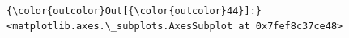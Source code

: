 \documentclass[11pt]{article}
\begin{document}
    \begin{center}
    \end{center}
    { \hspace*{\fill} \\}
    
\begin{Verbatim}[commandchars=\\\{\}]
{\color{outcolor}Out[{\color{outcolor}44}]:} <matplotlib.axes.\_subplots.AxesSubplot at 0x7fef8c37ce48>
\end{Verbatim}
            

    
    
    
    
\end{document}
